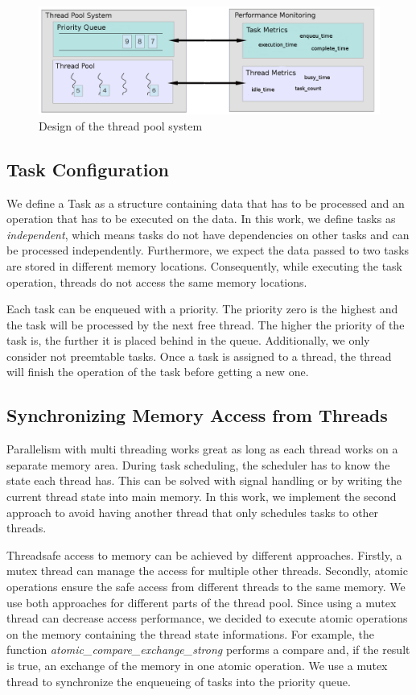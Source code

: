 \documentclass[conference]{IEEEtran}
\begin{document}
\begin{figure}[htbp]
	\includegraphics[width=1.0\textwidth]{img/pool_structure.png}
	\caption{Design of the thread pool system}
	\label{fig0}
\end{figure}

\subsection{Task Configuration}
We define a Task as a structure containing data that has to be processed and an operation that has to be executed on the data. In this work, we define tasks as \emph{independent}, which means tasks do not have dependencies on other tasks and can be processed independently. Furthermore, we expect the data passed to two tasks are stored in different memory locations. Consequently, while executing the task operation, threads do not access the same memory locations. 

Each task can be enqueued with a priority. The priority zero is the highest and the task will be processed by the next free thread. The higher the priority of the task is, the further it is placed behind in the queue. Additionally, we only consider not preemtable tasks. Once a task is assigned to a thread, the thread will finish the operation of the task before getting a new one. 

\subsection{Synchronizing Memory Access from Threads}
Parallelism with multi threading works great as long as each thread works on a separate memory area. During task scheduling, the scheduler has to know the state each thread has. This can be solved with signal handling or by writing the current thread state into main memory. In this work, we implement the second approach to avoid having another thread that only schedules tasks to other threads. 

Threadsafe access to memory can be achieved by different approaches. Firstly, a mutex thread can manage the access for multiple other threads. Secondly, atomic operations ensure the safe access from different threads to the same memory. We use both approaches for different parts of the thread pool. Since using a mutex thread can decrease access performance, we decided to execute atomic operations on the memory containing the thread state informations. For example, the function \emph{atomic\_compare\_exchange\_strong} performs a compare and, if the result is true, an exchange of the memory in one atomic operation. We use a mutex thread to synchronize the enqueueing of tasks into the priority queue.
\end{document}
